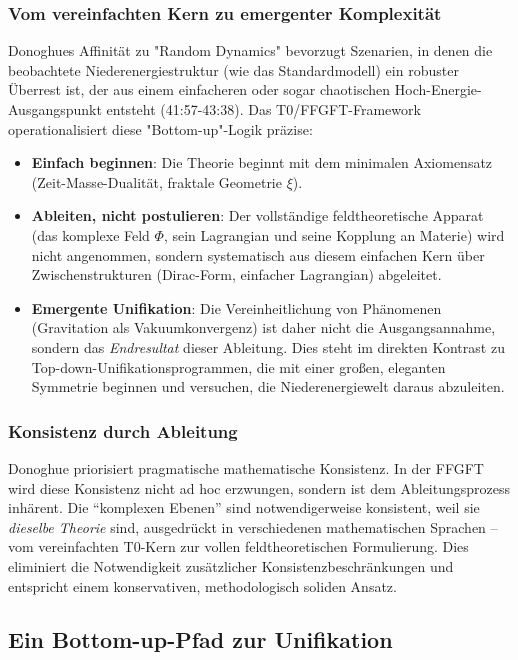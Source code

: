 	\subsubsection{Vom vereinfachten Kern zu emergenter Komplexität}
	Donoghues Affinität zu "Random Dynamics" bevorzugt Szenarien, in denen die beobachtete Niederenergiestruktur (wie das Standardmodell) ein robuster Überrest ist, der aus einem einfacheren oder sogar chaotischen Hoch-Energie-Ausgangspunkt entsteht \cite{DonoghueInterview2025} (41:57-43:38). Das T0/FFGFT-Framework operationalisiert diese "Bottom-up"-Logik präzise:
	\begin{itemize}
		\item \textbf{Einfach beginnen}: Die Theorie beginnt mit dem minimalen Axiomensatz (Zeit-Masse-Dualität, fraktale Geometrie \(\xi\)).
		\item \textbf{Ableiten, nicht postulieren}: Der vollständige feldtheoretische Apparat (das komplexe Feld \(\Phi\), sein Lagrangian und seine Kopplung an Materie) wird nicht angenommen, sondern systematisch aus diesem einfachen Kern über Zwischenstrukturen (Dirac-Form, einfacher Lagrangian) abgeleitet.
		\item \textbf{Emergente Unifikation}: Die Vereinheitlichung von Phänomenen (Gravitation als Vakuumkonvergenz) ist daher nicht die Ausgangsannahme, sondern das \emph{Endresultat} dieser Ableitung. Dies steht im direkten Kontrast zu Top-down-Unifikationsprogrammen, die mit einer großen, eleganten Symmetrie beginnen und versuchen, die Niederenergiewelt daraus abzuleiten.
	\end{itemize}
	
	\subsubsection{Konsistenz durch Ableitung}
	Donoghue priorisiert pragmatische mathematische Konsistenz. In der FFGFT wird diese Konsistenz nicht ad hoc erzwungen, sondern ist dem Ableitungsprozess inhärent. Die ``komplexen Ebenen'' sind notwendigerweise konsistent, weil sie \emph{dieselbe Theorie} sind, ausgedrückt in verschiedenen mathematischen Sprachen – vom vereinfachten T0-Kern zur vollen feldtheoretischen Formulierung. Dies eliminiert die Notwendigkeit zusätzlicher Konsistenzbeschränkungen und entspricht einem konservativen, methodologisch soliden Ansatz.
	
	\subsection{Ein Bottom-up-Pfad zur Unifikation}
	
